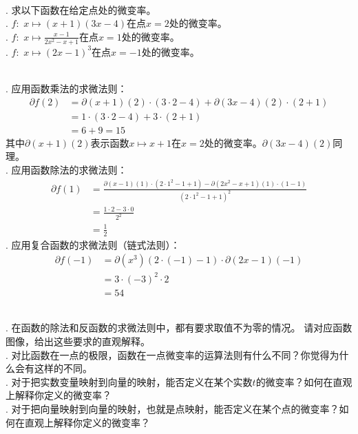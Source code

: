 \documentclass[12pt,UTF8]{ctexbook}
\begin{document}
\begin{et}
    \mbox{} \\
    . 求以下函数在给定点处的微变率。\\
    . $f: \,\, x \mapsto (x + 1)(3x -4)$在点$x = 2$处的微变率。\\
    . $f: \,\, x \mapsto \frac{x - 1}{2x^2 - x + 1}$在点$x = 1$处的微变率。\\
    . $f: \,\, x \mapsto (2x - 1)^3$在点$x = -1$处的微变率。\\
\end{et}

\begin{so}
    \mbox{} \\
    . 应用函数乘法的求微法则：
    \begin{align*}
        \partial f(2) &= \partial (x + 1) (2) \cdot (3 \cdot 2 - 4) + \partial (3x - 4) (2) \cdot (2 + 1)  \\
        &= 1 \cdot (3 \cdot 2 - 4) + 3 \cdot (2 + 1)  \\
        &= 6 + 9 = 15   
    \end{align*}
    其中$\partial (x + 1) (2)$表示函数$x\mapsto x + 1$在$x = 2$处的微变率。$\partial (3x - 4) (2)$同理。\\
    . 应用函数除法的求微法则：
    \begin{align*}
        \partial f(1) &= \frac{\partial (x - 1) (1) \cdot (2 \cdot 1^2 - 1 + 1) - \partial (2x^2 - x + 1) (1) \cdot (1 - 1)}{(2\cdot 1^2 - 1 + 1)^2}  \\
        &= \frac{ 1 \cdot 2 - 3 \cdot 0}{2^2}  \\
        &= \frac{1}{2}   
    \end{align*}
    . 应用复合函数的求微法则（链式法则）：
    \begin{align*}
        \partial f(-1) &= \partial (x^3) (2\cdot (-1) - 1) \cdot \partial (2x - 1) (-1)  \\
        &= 3\cdot (-3)^2 \cdot 2  \\
        &= 54   
    \end{align*}

\end{so}

\begin{sk}
    \mbox{} \\
    . 在函数的除法和反函数的求微法则中，都有要求取值不为零的情况。
    请对应函数图像，给出这些要求的直观解释。\\
    . 对比函数在一点的极限，函数在一点微变率的运算法则有什么不同？你觉得为什么会有这样的不同。\\
    . 对于把实数变量映射到向量的映射，能否定义在某个实数$t$的微变率？如何在直观上解释你定义的微变率？\\
    . 对于把向量映射到向量的映射，也就是点映射，能否定义在某个点的微变率？如何在直观上解释你定义的微变率？
    
\end{sk}
\end{document}
